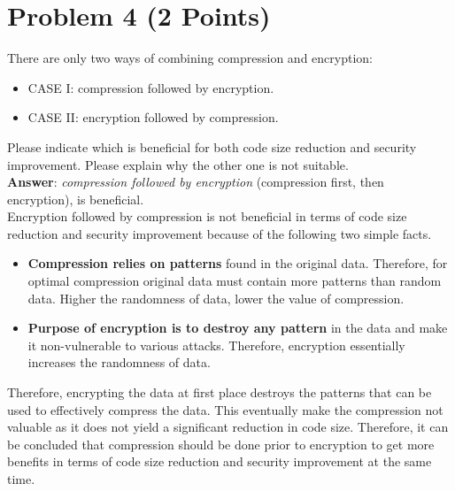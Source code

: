 \documentclass[11pt,letterpaper]{article}
\begin{document}
	

	\section*{Problem 4 (2 Points)}
	
	There are only two ways of combining compression and encryption: 
	
	\begin{itemize}
		\item CASE I: compression followed by encryption.
		\item CASE II: encryption followed by compression.
	\end{itemize}
	
	Please  indicate  which  is beneficial for both  code  size  reduction  and  security  improvement.  Please explain why the other one is not suitable.\\
	
	\textbf{\Large Answer}: \textit{compression followed by encryption} (compression first, then encryption), is beneficial.\\
	
	Encryption followed by compression is not beneficial in terms of code size reduction and security improvement because of the following two simple facts.
	
	\begin{itemize}
		\item \textbf{Compression relies on patterns} found in the original data. Therefore, for optimal compression original data must contain more patterns than random data. Higher the randomness of data, lower the value of compression.
		
		\item \textbf{Purpose of encryption is to destroy any pattern} in the data and make it non-vulnerable to various attacks. Therefore, encryption essentially increases the randomness of data.
		
	\end{itemize}

	Therefore, encrypting the data at first place destroys the patterns that can be used to effectively compress the data. This eventually make the compression not valuable as it does not yield a significant reduction in code size. Therefore, it can be concluded that compression should be done prior to encryption  to get more benefits in terms of code size reduction and security improvement at the same time.
	
\end{document}
